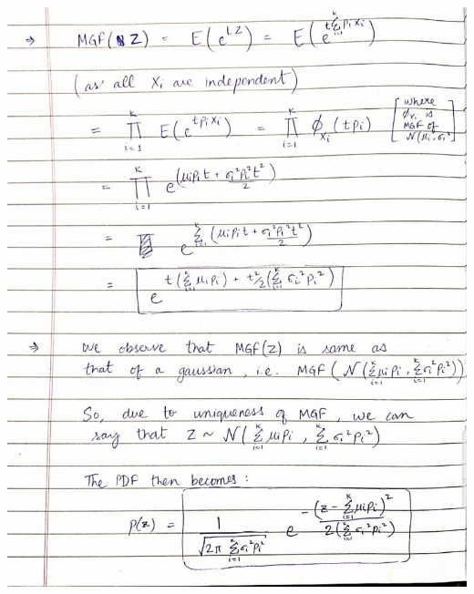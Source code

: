 \documentclass{article}
\theoremstyle{remark}
\begin{document}
\includegraphics[width=\textwidth, height=\textheight, keepaspectratio]{q2-3.jpeg} \par
\end{document}
